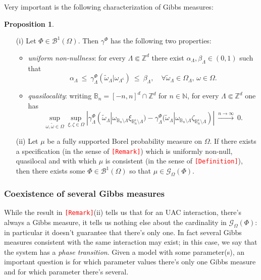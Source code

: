 \documentclass[12pt]{article}
\newcommand{\BB}{\mathscr{B}}
\newcommand{\BBB}{\mathbb{B}}
\newcommand{\G}{\mathcal{G}}
\newcommand{\N}{\mathbb{N}}
\newcommand{\Z}{\mathbb{Z}}
\newcommand{\ra}{\rightarrow}
\newcommand{\1}{\mathbbm{1}}
\renewcommand{\c}{\mathsf{c}}
\newcommand{\5}{\vspace{0.5cm}}
\renewcommand{\tilde}{\widetilde}
\theoremstyle{definition}
\newtheorem{prop}[thm]{Proposition}
\begin{document}
Very important is the following characterization of Gibbs measures:
\begin{prop}
~
\begin{itemize}
	\item[(i)] Let $\Phi\in\BB^1(\Omega)$. Then $\gamma^\Phi$ has the following two properties:
		\begin{itemize}
			\item \textit{uniform non-nullness}: for every $\Lambda\Subset\Z^d$ there exist $\alpha_\Lambda,\beta_\Lambda\in(0,1)$ such that
			$$\alpha_\Lambda ~\leq~ \gamma_\Lambda^\Phi(\tilde{\omega}_\Lambda|\omega_{\Lambda^\c}) ~\leq~ \beta_\Lambda, \quad\forall\tilde{\omega}_\Lambda\in\Omega_\Lambda,\,\omega\in\Omega.$$
			\item \textit{quasilocality}: writing $\BBB_n=[-n,n]^d\cap\Z^d$ for $n\in\N$, for every $\Lambda\Subset\Z^d$ one has
			$$\sup_{\omega,\tilde{\omega}\in\Omega}\sup_{\xi,\zeta\in\Omega}|\gamma_\Lambda^\Phi(\tilde{\omega}_\Lambda|\omega_{\BBB_n\setminus\Lambda}\xi_{\BBB_n^\c\setminus\Lambda})-\gamma_\Lambda^\Phi(\tilde{\omega}_\Lambda|\omega_{\BBB_n\setminus\Lambda}\zeta_{\BBB_n^\c\setminus\Lambda})| ~\xrightarrow{n\ra\infty}~ 0.$$
		\end{itemize}
		\item[(ii)] Let $\mu$ be a fully supported Borel probability measure on $\Omega$. If there exists a specification (in the sense of \textcolor{red}{\texttt{[Remark]}}) which is uniformly non-null, quasilocal and with which $\mu$ is consistent (in the sense of \textcolor{red}{\texttt{[Definition]}}), then there exists some $\Phi\in\BB^1(\Omega)$ so that $\mu\in\G_\Omega(\Phi)$.
		
\end{itemize}
\end{prop}


\subsubsection{Coexistence of several Gibbs measures}

While the result in \textcolor{red}{\texttt{[Remark]}}(ii) tells us that for an UAC interaction, there's always a Gibbs measure, it tells us nothing else about the cardinality in $\G_\Omega(\Phi)$: in particular it doesn't guarantee that there's only one. In fact several Gibbs measures consistent with the same interaction may exist; in this case, we say that the system has a \textit{phase transition}. Given a model with some parameter(s), an important question is for which parameter values there's only one Gibbs measure and for which parameter there's several. \\
\end{document}
